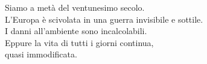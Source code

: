 \clearpage
\thispagestyle{empty}
\pagecolor{black}
\color{white}

\vspace*{\fill}

\begin{center}
\Large
Siamo a metà del ventunesimo secolo.\\[1em]
L’Europa è scivolata in una guerra invisibile e sottile.\\[1em]
I danni all’ambiente sono incalcolabili.\\[1em]
Eppure la vita di tutti i giorni continua,\\
quasi immodificata.
\end{center}

\vspace*{\fill}

\clearpage
\nopagecolor
\color{black}
